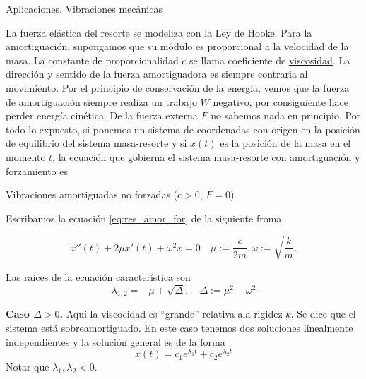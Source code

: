 \documentclass[handout,hyperref={colorlinks=true}]{beamer}
\begin{document}
\begin{frame}{Aplicaciones. Vibraciones mecánicas }

La fuerza elástica del resorte se modeliza con la Ley de Hooke. 
Para la amortiguación, supongamos que su módulo  es proporcional a la velocidad de la masa. La constante de proporcionalidad $c$ se llama coeficiente de 
\href{http://es.wikipedia.org/wiki/Viscosidad}{viscosidad}. La dirección y sentido de la fuerza amortiguadora es siempre contraria 
al movimiento. Por el principio de conservación de la energía, vemos que la fuerza de amortiguación siempre realiza un trabajo $W$ negativo, por consiguiente
hace perder energía cinética. De la fuerza externa $F$ no sabemos nada en principio. Por todo lo expuesto, si ponemos un sistema 
de coordenadas con origen en la posición de equilibrio del sistema masa-resorte y si $x(t)$ es la posición de la masa en el momento $t$, la ecuación que gobierna 
el sistema masa-resorte con amortiguación y forzamiento es 


\end{frame}

\begin{frame}{ Vibraciones amortiguadas no forzadas ($c>0$, $F=0$) }
 
Escribamos la ecuación \eqref{eq:res_amor_for} de la siguiente froma

\begin{equation}\label{eq:res_amor}
  \boxed{x''(t)+2\mu x'(t)+\omega^2x=0}\quad \mu:=\frac{c}{2m},\omega:=\sqrt{\frac{k}{m}}. 
\end{equation}

Las raíces de la ecuación característica son
\[
 \boxed{\lambda_{1,2}=-\mu\pm\sqrt{\Delta},\quad \Delta:=\mu^2-\omega^2}
\]

\textbf{Caso $\Delta>0$.} Aquí la viscocidad es ``grande'' relativa ala rigidez $k$. Se dice que el sistema está sobreamortiguado. En este caso tenemos dos soluciones
linealmente independientes y la solución general es de la forma
\[x(t)=c_1e^{\lambda_1t}+c_2e^{\lambda_2t}\]
Notar que $\lambda_1,\lambda_2<0$.
\end{frame}
\end{document}

